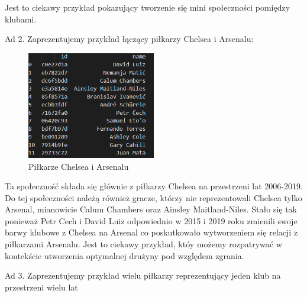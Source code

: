 \documentclass{article}
\begin{document}
Jest to ciekawy przykład pokazujący tworzenie się mini społeczności pomiędzy klubami.

Ad 2. Zaprezentujemy przykład łączący piłkarzy Chelsea i Arsenalu:

\begin{figure}[H]
    \centering
    \includegraphics[width=0.5\textwidth]{images/chearse.png}
    \caption{Piłkarze Chelsea i Arsenalu}
    \label{fig:my_label}
\end{figure}

Ta społeczność składa się głównie z piłkarzy Chelsea na przestrzeni lat 2006-2019. Do tej społeczności należą również gracze, którzy nie reprezentowali Chelsea tylko Arsenal, mianowicie Calum Chambers oraz Ainsley Maitland-Niles. Stało się tak ponieważ Petr Cech i David Luiz odpowiednio w 2015 i 2019 roku zmienili swoje barwy klubowe z Chelsea na Arsenal co poskutkowało wytworzeniem się relacji z piłkarzami Arsenalu.
Jest to ciekawy przykład, któy możemy rozpatrywać w kontekście utworzenia optymalnej drużyny pod względem zgrania.

Ad 3. Zaprezentujemy przykład wielu piłkarzy reprezentujący jeden klub na przestrzeni wielu lat
\end{document}
